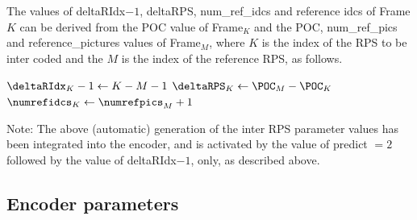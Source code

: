 \documentclass[a4paper,11pt]{jctvcdoc}
\begin{document}
The values of deltaRIdx$-1$, deltaRPS, num_ref_idcs and reference
idcs of Frame$K$ can be derived from the POC value of Frame$_K$ and
the POC, num_ref_pics and reference_pictures values of Frame$_M$, where
$K$ is the index of the RPS to be inter coded and the $M$ is the
index of the reference RPS, as follows.

\setlength{\algomargin}{2em}
\begin{algorithm}[h]

$\deltaRIdx_K - 1  \leftarrow  K - M - 1$ \;
$\deltaRPS_K       \leftarrow  \POC_M - \POC_K$ \;
$\numrefidcs_K     \leftarrow  \numrefpics_M + 1$ \;


\end{algorithm}

Note: The above (automatic) generation of the inter RPS parameter
values has been integrated into the encoder, and is activated by
the value of predict $= 2$ followed by the value of deltaRIdx$-1$,
only, as described above.



\subsection{Encoder parameters}
\end{document}
